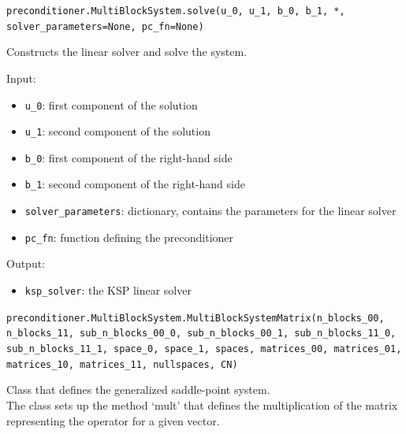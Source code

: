\documentclass[letterpaper,10pt,english]{sphinxmanual}
\begin{document}
\vspace{3ex}

\texttt{preconditioner.MultiBlockSystem.solve(u{\_}0, u{\_}1, b{\_}0, b{\_}1, *, solver{\_}parameters=None, pc{\_}fn=None)}

Constructs the linear solver and solve the system.

Input:
\begin{itemize}
\item \texttt{u{\_}0}: first component of the solution

\item \texttt{u{\_}1}: second component of the solution

\item \texttt{b{\_}0}: first component of the right-hand side

\item \texttt{b{\_}1}: second component of the right-hand side

\item \texttt{solver{\_}parameters}: dictionary, contains the parameters
            for the linear solver

\item \texttt{pc{\_}fn}: function defining the preconditioner
\end{itemize}

Output:
\begin{itemize}
\item \texttt{ksp\_solver}: the KSP linear solver
\end{itemize}

\vspace{3ex}

\texttt{preconditioner.MultiBlockSystem.MultiBlockSystemMatrix(n{\_}blocks{\_}00, n{\_}blocks{\_}11, sub{\_}n{\_}blocks{\_}00{\_}0, sub{\_}n{\_}blocks{\_}00{\_}1, sub{\_}n{\_}blocks{\_}11{\_}0, sub{\_}n{\_}blocks{\_}11{\_}1, space{\_}0, space{\_}1, spaces, matrices{\_}00, matrices{\_}01, matrices{\_}10, matrices{\_}11, nullspaces, CN)}

Class that defines the generalized saddle-point system.\\
The class sets up the method `mult' that defines the multiplication of the matrix representing the operator for a given vector.
\end{document}
